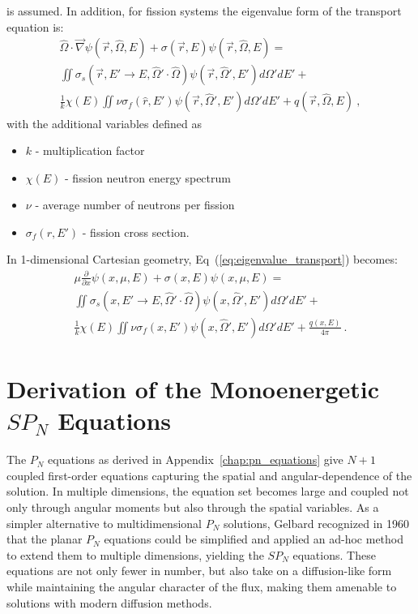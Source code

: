 is assumed. In addition, for fission systems the eigenvalue form of
the transport equation is:
\begin{multline}
  \hat{\Omega} \cdot \vec{\nabla} \psi(\vec{r},\hat{\Omega},E) +
  \sigma(\vec{r},E) \psi(\vec{r},\hat{\Omega},E) = \\ \iint
  \sigma_s(\vec{r},E' \rightarrow E,\hat{\Omega}' \cdot \hat{\Omega})
  \psi(\vec{r},\hat{\Omega}',E') d\Omega' dE' + \\ \frac{1}{k} \chi(E)
  \iint \nu \sigma_f(\hat{r},E') \psi(\vec{r},\hat{\Omega}',E')
  d\Omega' dE' + q(\vec{r},\hat{\Omega},E) \:,
  \label{eq:eigenvalue_transport}
\end{multline}
with the additional variables defined as
\begin{itemize}
\item $k$ - multiplication factor
\item $\chi(E)$ - fission neutron energy spectrum
\item $\nu$ - average number of neutrons per fission
\item $\sigma_f(r,E')$ - fission cross section\:.
\end{itemize}
In 1-dimensional Cartesian geometry,
Eq~(\ref{eq:eigenvalue_transport}) becomes:
\begin{multline}
  \mu \frac{\partial}{\partial x} \psi(x,\mu,E) + \sigma(x,E)
  \psi(x,\mu,E) = \\ \iint \sigma_s(x,E' \rightarrow
  E,\hat{\Omega}' \cdot \hat{\Omega}) \psi(x,\hat{\Omega}',E')
  d\Omega' dE' + \\ \frac{1}{k} \chi(E)
  \iint \nu \sigma_f(x,E') \psi(x,\hat{\Omega}',E') d\Omega'
  dE' + \frac{q(x,E)}{4 \pi}\:.
  \label{eq:cart_1d_eigenvalue}
\end{multline}

\section{Derivation of the Monoenergetic $SP_N$ Equations}
\label{sec:spn_equations}
The $P_N$ equations as derived in Appendix~\ref{chap:pn_equations}
give $N+1$ coupled first-order equations capturing the spatial and
angular-dependence of the solution. In multiple dimensions, the
equation set becomes large and coupled not only through angular
moments but also through the spatial variables. As a simpler
alternative to multidimensional $P_N$ solutions, Gelbard recognized in
1960 that the planar $P_N$ equations could be simplified and applied
an ad-hoc method to extend them to multiple dimensions, yielding the
$SP_N$ equations. These equations are not only fewer in number, but
also take on a diffusion-like form while maintaining the angular
character of the flux, making them amenable to solutions with modern
diffusion methods.

